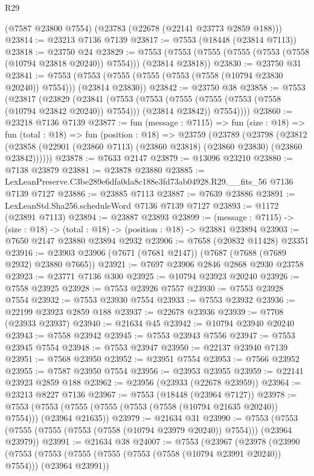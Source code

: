 \begin{lexlean}{R29}
\begin{coremodule}
    (@7587 @23800 @7554)
    (@23783 (@22678 (@22141 @23773 @2859 @188)))
@23814 := @23213 @7136 @7139
@23817 := @7553 (@18448 (@23814 @7113))
@23818 := @23750 @24
@23829 := @7553 (@7553 (@7555 (@7555 (@7553 (@7558 (@10794 @23818 @20240)) @7554))) (@23814 @23818))
@23830 := @23750 @31
@23841 := @7553 (@7553 (@7555 (@7555 (@7553 (@7558 (@10794 @23830 @20240)) @7554))) (@23814 @23830))
@23842 := @23750 @38
@23858 := @7553
    (@23817
      (@23829
        (@23841
          (@7553
            (@7553 (@7555 (@7555 (@7553 (@7558 (@10794 @23842 @20240)) @7554))) (@23814 @23842))
            @7554))))
@23860 := @23218 @7136 @7139
@23877 := fun (message : @7115) =>
  fun (size : @18) =>
  fun (total : @18) =>
  fun (position : @18) =>
  @23759
    (@23789
      (@23798
        (@23812 (@23858 (@22901 (@23860 @7113) (@23860 @23818) (@23860 @23830) (@23860 @23842))))))
@23878 := @7633 @2147
@23879 := @13096 @23210
@23880 := @7138 @23879
@23881 := @23878 @23880
@23885 := LexLeanPreserve.C3be289e6dfa0da8c188e3fd73ab04928.R29.__fits_56 @7136 @7139 @7127
@23886 := @23885 @7113
@23887 := @7639 @23886
@23891 := LexLeanStd.Sha256.scheduleWord @7136 @7139 @7127
@23893 := @1172 (@23891 @7113)
@23894 := @23887 @23893
@23899 := (message : @7115) -> (size : @18) -> (total : @18) -> (position : @18) -> @23881 @23894
@23903 := @7650 @2147 @23880 @23894 @2932
@23906 := @7658 (@20832 @11428) @23351
@23916 := @23903 @23906 (@7671 (@7681 @2147)) (@7687 (@7688 (@7689 @2932) @23880 @7665))
@23921 := @7697 @23906 @2846 @2868 @2930 @23758
@23923 := @23771 @7136 @300
@23925 := @10794 @23923 @20240
@23926 := @7558 @23925
@23928 := @7553 @23926 @7557
@23930 := @7553 @23928 @7554
@23932 := @7553 @23930 @7554
@23933 := @7553 @23932
@23936 := @22199 @23923 @2859 @188
@23937 := @22678 @23936
@23939 := @7708 (@23933 @23937)
@23940 := @21634 @45
@23942 := @10794 @23940 @20240
@23943 := @7558 @23942
@23945 := @7553 @23943 @7556
@23947 := @7553 @23945 @7554
@23948 := @7553 @23947
@23950 := @22137 @23940 @7139
@23951 := @7568 @23950
@23952 := @23951 @7554
@23953 := @7566 @23952
@23955 := @7587 @23950 @7554
@23956 := @23953 @23955
@23959 := @22141 @23923 @2859 @188
@23962 := @23956 (@23933 (@22678 @23959))
@23964 := @23213 @8227 @7136
@23967 := @7553 (@18448 (@23964 @7127))
@23978 := @7553 (@7553 (@7555 (@7555 (@7553 (@7558 (@10794 @21635 @20240)) @7554))) (@23964 @21635))
@23979 := @21634 @31
@23990 := @7553 (@7553 (@7555 (@7555 (@7553 (@7558 (@10794 @23979 @20240)) @7554))) (@23964 @23979))
@23991 := @21634 @38
@24007 := @7553
    (@23967
      (@23978
        (@23990
          (@7553
            (@7553 (@7555 (@7555 (@7553 (@7558 (@10794 @23991 @20240)) @7554))) (@23964 @23991))

\end{coremodule}
\end{lexlean}
